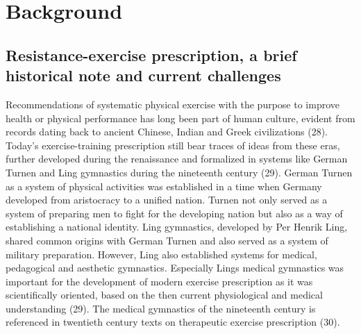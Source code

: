 \documentclass[twoside,10pt]{gihclass} %
\begin{document}
\hypertarget{background}{%
\chapter{Background}\label{background}}

\hypertarget{resistance-exercise-prescription-a-brief-historical-note-and-current-challenges}{%
\section{Resistance-exercise prescription, a brief historical note and current challenges}\label{resistance-exercise-prescription-a-brief-historical-note-and-current-challenges}}

Recommendations of systematic physical exercise with the purpose to improve health or physical performance has long been part of human culture, evident from records dating back to ancient Chinese, Indian and Greek civilizations
(28).
Today's exercise-training prescription still bear traces of ideas from these eras, further developed during the renaissance and formalized in systems like German Turnen and Ling gymnastics during the nineteenth century
(29).
German Turnen as a system of physical activities was established in a time when Germany developed from aristocracy to a unified nation.
Turnen not only served as a system of preparing men to fight for the developing nation but also as a way of establishing a national identity.
Ling gymnastics, developed by Per Henrik Ling, shared common origins with German Turnen and also served as a system of military preparation.
However, Ling also established systems for medical, pedagogical and aesthetic gymnastics.
Especially Lings medical gymnastics was important for the development of modern exercise prescription as it was scientifically oriented, based on the then current physiological and medical understanding (29).
The medical gymnastics of the nineteenth century is referenced in twentieth century texts on therapeutic exercise prescription
(30).
\end{document}
